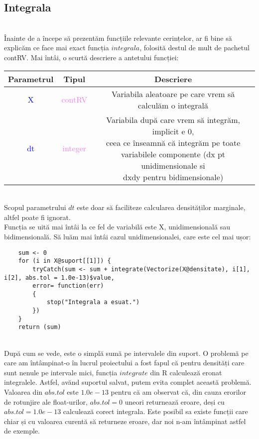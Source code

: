 \documentclass[12pt]{article}
\begin{document}
\subsection{Integrala}\hfill \\
\indent Înainte de a începe să prezentăm funcțiile relevante cerințelor, ar fi bine să explicăm ce face mai exact funcția $integrala$, folosită destul de mult de pachetul contRV. Mai întâi, o scurtă descriere a antetului funcției:
\begin{center}
	\begin{tabular}{|| c | c | c ||}
		\hline
		Parametrul & Tipul & Descriere \\
		\hline
		\textcolor{blue}{X} & \textcolor{violet}{contRV} & Variabila aleatoare pe care vrem să calculăm o integrală\\
		\hline
		\textcolor{blue}{dt} & \textcolor{violet}{integer} & \makecell{Variabila după care vrem să integrăm, implicit e 0, \\ceea ce înseamnă că integrăm pe toate \\variabilele componente (dx pt unidimensionale si\\ dxdy pentru bidimensionale)} \\
		\hline
	\end{tabular}
\end{center}\hfill \\
\indent Scopul parametrului $dt$ este doar să faciliteze calcularea densităților marginale, altfel poate fi ignorat.\\
\indent Funcția se uită mai întâi la ce fel de variabilă este X, unidimensională sau bidimensională. Să luăm mai întâi cazul unidimensionalei, care este cel mai ușor:
\begin{lstlisting}
	sum <- 0
	for (i in X@suport[[1]]) {
		tryCatch(sum <- sum + integrate(Vectorize(X@densitate), i[1], i[2], abs.tol = 1.0e-13)$value,
		error= function(err)
		{
			stop("Integrala a esuat.")
		})
	}
	return (sum)
\end{lstlisting}\hfill \\
\indent După cum se vede, este o simplă sumă pe intervalele din suport. O problemă pe care am întâmpinat-o în lucrul proiectului a fost fapul că pentru densități care sunt nenule pe intervale mici, funcția $integrate$ din R calculează eronat integralele. Astfel, avănd suportul salvat, putem evita complet această problemă. Valoarea din $abs.tol$ este $1.0e-13$ pentru că am observat că, din cauza erorilor de rotunjire ale float-urilor, $abs.tol = 0$ uneori returnează eroare, deși cu $abs.tol = 1.0e-13$ calculează corect integrala. Este posibil sa existe funcții care chiar și cu valoarea curentă să returneze eroare, dar noi n-am întâmpinat astfel de exemple.\\
\end{document}
